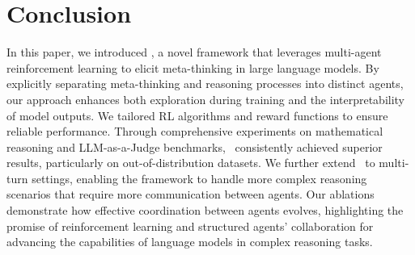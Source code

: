 
\section{Conclusion}

In this paper, we introduced \method, a novel framework that leverages multi-agent reinforcement learning to elicit meta-thinking in large language models. 
By explicitly separating meta-thinking and reasoning processes into distinct agents, our approach enhances both exploration during training and the interpretability of model outputs. 
We tailored RL algorithms and reward functions to ensure reliable performance. 
Through comprehensive experiments on mathematical reasoning and LLM-as-a-Judge benchmarks, \method~consistently achieved superior results, particularly on out-of-distribution datasets. 
We further extend \method~to multi-turn settings, enabling the framework to handle more complex reasoning scenarios that require more communication between agents.
Our ablations demonstrate how effective coordination between agents evolves, highlighting the promise of reinforcement learning and structured agents' collaboration for advancing the capabilities of language models in complex reasoning tasks.

